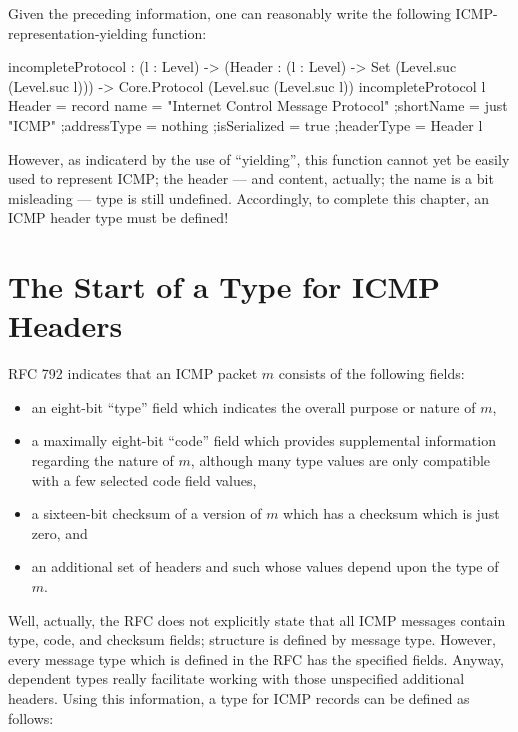 \documentclass{report}
\begin{document}
\begin{itemize}
Given the preceding information, one can reasonably write the following ICMP-representation-yielding function:

\begin{code}
  incompleteProtocol  : (l : Level)
                     -> (Header  : (l : Level)
                                -> Set (Level.suc (Level.suc l)))
                     -> Core.Protocol (Level.suc (Level.suc l))
  incompleteProtocol l Header = record
    {name = "Internet Control Message Protocol"
    ;shortName = just "ICMP"
    ;addressType = nothing
    ;isSerialized = true
    ;headerType = Header l
    }
\end{code}

However, as indicaterd by the use of ``yielding'', this function cannot yet be easily used to represent ICMP; the header --- and content, actually; the name is a bit misleading --- type is still undefined.  Accordingly, to complete this chapter, an ICMP header type must be defined!

\section{The Start of a Type for ICMP Headers}

RFC 792 indicates that an ICMP packet \(m\) consists of the following fields:

\begin{itemize}
  \item an eight-bit ``type'' field which indicates the overall purpose or nature of \(m\),
  \item a maximally eight-bit ``code'' field which provides supplemental information regarding the nature of \(m\), although many type values are only compatible with a few selected code field values,
  \item a sixteen-bit checksum of a version of \(m\) which has a checksum which is just zero, and
  \item an additional set of headers and such whose values depend upon the type of \(m\).
\end{itemize}

Well, actually, the RFC does not explicitly state that all ICMP messages contain type, code, and checksum fields; structure is defined by message type.  However, every message type which is defined in the RFC has the specified fields.  Anyway, dependent types really facilitate working with those unspecified additional headers.  Using this information, a type for ICMP records can be defined as follows:


\end{itemize}
\end{document}
